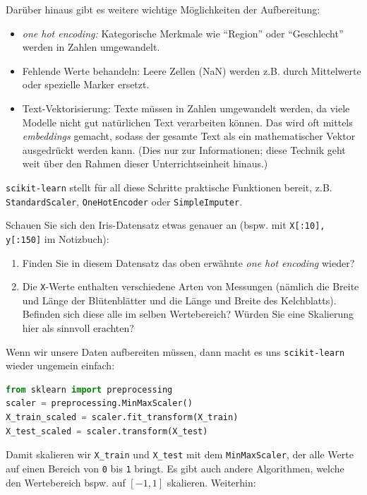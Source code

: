 \begin{lpu}
Darüber hinaus gibt es weitere wichtige Möglichkeiten der Aufbereitung:

\begin{itemize}
  \item \textit{one hot encoding:} Kategorische Merkmale wie ``Region'' oder ``Geschlecht'' werden in Zahlen umgewandelt.
  \item Fehlende Werte behandeln: Leere Zellen (NaN) werden z.B. durch Mittelwerte oder spezielle Marker ersetzt.
  \item Text-Vektorisierung: Texte müssen in Zahlen umgewandelt werden, da viele Modelle nicht gut natürlichen Text verarbeiten können. Das wird oft mittels \textit{embeddings} gemacht, sodass der gesamte Text als ein mathematischer Vektor ausgedrückt werden kann. (Dies nur zur Informationen; diese Technik geht weit über den Rahmen dieser Unterrichtseinheit hinaus.)
\end{itemize}

\texttt{scikit-learn} stellt für all diese Schritte praktische Funktionen bereit, z.B. \texttt{StandardScaler}, \texttt{OneHotEncoder} oder \texttt{SimpleImputer}.

\begin{aufgabe}{2}
Schauen Sie sich den Iris-Datensatz etwas genauer an (bspw. mit \texttt{X[:10], y[:150]} im Notizbuch):

\begin{enumerate}
    \item Finden Sie in diesem Datensatz das oben erwähnte \textit{one hot encoding} wieder?
    \item Die \texttt{X}-Werte enthalten verschiedene Arten von Messungen (nämlich die Breite und Länge der Blütenblätter und die Länge und Breite des Kelchblatts). Befinden sich diese alle im selben Wertebereich? Würden Sie eine Skalierung hier als sinnvoll erachten?
\end{enumerate}
\end{aufgabe}

Wenn wir unsere Daten aufbereiten müssen, dann macht es uns \texttt{scikit-learn} wieder ungemein einfach:
\begin{lstlisting}[language=Python]
from sklearn import preprocessing
scaler = preprocessing.MinMaxScaler()
X_train_scaled = scaler.fit_transform(X_train)
X_test_scaled = scaler.transform(X_test)
\end{lstlisting}

Damit skalieren wir \texttt{X\_train} und \texttt{X\_test} mit dem \texttt{MinMaxScaler}, der alle Werte auf einen Bereich von \texttt{0} bis \texttt{1} bringt. Es gibt auch andere Algorithmen, welche den Wertebereich bspw. auf $[-1,1]$ skalieren. Weiterhin:


\end{lpu}
